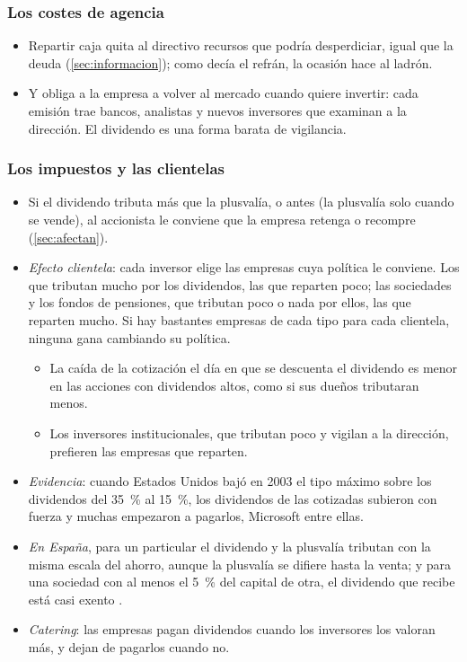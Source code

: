 \documentclass[11pt]{article}
\begin{document}
\subsubsection{Los costes de agencia}\label{sec:agencia-dividendos}

\begin{itemize}
\item Repartir caja quita al directivo recursos que podría desperdiciar, igual que la deuda\nocite{Jensen1986Agency} (\ref{sec:informacion}); como decía el refrán, la ocasión hace al ladrón.
\item Y obliga a la empresa a volver al mercado cuando quiere invertir: cada emisión trae bancos, analistas y nuevos inversores que examinan a la dirección. El dividendo es una forma barata de vigilancia\nocite{Easterbrook1984Two}.
\end{itemize}

\subsubsection{Los impuestos y las clientelas}\label{sec:clientelas}

\begin{itemize}
\item Si el dividendo tributa más que la plusvalía, o antes (la plusvalía solo cuando se vende), al accionista le conviene que la empresa retenga o recompre (\ref{sec:afectan}).
\item \emph{Efecto clientela}: cada inversor elige las empresas cuya política le conviene. Los que tributan mucho por los dividendos, las que reparten poco; las sociedades y los fondos de pensiones, que tributan poco o nada por ellos, las que reparten mucho\nocite{MillerModigliani1961Dividend}. Si hay bastantes empresas de cada tipo para cada clientela, ninguna gana cambiando su política.
  \begin{itemize}
  \item La caída de la cotización el día en que se descuenta el dividendo es menor en las acciones con dividendos altos, como si sus dueños tributaran menos\nocite{EltonGruber1970Marginal}.
  \item Los inversores institucionales, que tributan poco y vigilan a la dirección, prefieren las empresas que reparten\nocite{AllenBernardoWelch2000Theory}.
  \end{itemize}
\item \emph{Evidencia}: cuando Estados Unidos bajó en 2003 el tipo máximo sobre los dividendos del 35~\% al 15~\%, los dividendos de las cotizadas subieron con fuerza y muchas empezaron a pagarlos, Microsoft entre ellas\nocite{ChettySaez2005Dividend}.
\item \emph{En España}, para un particular el dividendo y la plusvalía tributan con la misma escala del ahorro\nocite{LIRPF2006}, aunque la plusvalía se difiere hasta la venta; y para una sociedad con al menos el 5~\% del capital de otra, el dividendo que recibe está casi exento\nocite{LIS2014} .
\item \emph{Catering}: las empresas pagan dividendos cuando los inversores los valoran más, y dejan de pagarlos cuando no\nocite{BakerWurgler2004Catering}.
\end{itemize}
\end{document}
